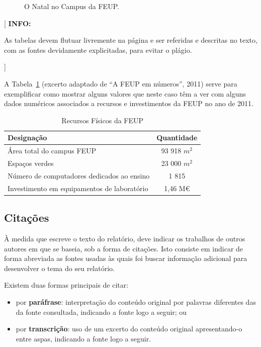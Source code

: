 \documentclass[11pt,a4paper]{report}
\newenvironment{info}[1]{\vspace*{6mm}\color{blue}
                            [ \textbf{INFO:} \begin{em} #1}
                        {\vspace*{3mm}\end{em} ]}
\begin{document}
\lipsum[4]

\begin{figure} [b]
  \centering
  \caption{O Natal no Campus da FEUP.} \label{fig:natal}
\end{figure}

\lipsum[4]

\begin{info}
As tabelas devem flutuar livremente na página e ser referidas e
descritas no texto, com as fontes devidamente explicitadas, para
evitar o plágio.
\end{info}

A Tabela~\ref{tab:feup} (excerto adaptado de ``A FEUP em números'', 2011)
serve para exemplificar como mostrar alguns valores que neste caso têm
a ver com alguns dados numéricos associados a recursos e investimentos
da FEUP no ano de 2011. 

\lipsum[4]

\begin{table}
  \centering
  \caption{Recursos Físicos da FEUP}
  \begin{tabular}{| l | c |}
    \hline
    \textbf{Designação} & \textbf{Quantidade}\\\hline
    \hline
    Área total do campus FEUP & 93 918 $m^2$\\\hline
    Espaços verdes & 23 000 $m^2$\\\hline
    Número de computadores dedicados ao ensino & 1 815\\\hline
    Investimento em equipamentos de laboratório & 1,46 M€\\
    \hline
  \end{tabular}
  \label{tab:feup}
\end{table}

\lipsum[4]

\subsection*{Citações}

À medida que escreve o texto do relatório, deve indicar os trabalhos
de outros autores em que se baseia, sob a forma de citações.
Isto consiste em indicar de forma abreviada as fontes usadas às quais
foi buscar informação adicional para desenvolver o tema do seu
relatório.

Existem duas formas principais de citar:
\begin{itemize}
\item por \textbf{paráfrase}: interpretação do conteúdo original por
  palavras diferentes das da fonte consultada, indicando a fonte logo
  a seguir; ou 
\item 
  por \textbf{transcrição}: uso de um excerto do conteúdo original
  apresentando-o entre aspas, indicando a fonte logo a seguir.
\end{itemize}
\end{document}
